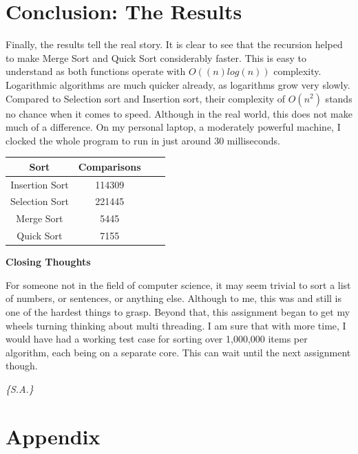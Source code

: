 \documentclass[letterpaper, 10pt]{article}
\begin{document}
\section{Conclusion: The Results}

Finally, the results tell the real story. It is clear to see that the recursion helped to make Merge Sort and Quick Sort considerably faster. This is easy to understand as both functions operate with $O((n)log(n))$ complexity. Logarithmic algorithms are much quicker already, as logarithms grow very slowly.
Compared to Selection sort and Insertion sort, their complexity of $O(n^2)$ stands no chance when it comes to speed. Although in the real world, this does not make much of a difference. On my personal laptop, a moderately powerful machine, I clocked the whole program to run in just around 30 milliseconds.

\begin{center}
{
 \begin{tabular}{||c c c c||} 
 \hline
 Sort & Comparisons \\ [0.5ex] 
 \hline\hline
 Insertion Sort& 114309 \\ 
 \hline
 Selection Sort& 221445 \\
 \hline
 Merge Sort& 5445 \\
 \hline
 Quick Sort& 7155 \\ [1ex] 
 \hline
\end{tabular}
}
\end{center}


\newpage
\textbf{Closing Thoughts}

 For someone not in the field of computer science, it may seem trivial to sort a list of numbers, or sentences, or anything else. Although to me, this was and still is one of the hardest things to grasp. Beyond that, this assignment began to get my wheels turning thinking about multi threading. I am sure that with more time, I would have had a working test case for  sorting over 1,000,000 items per algorithm, each being on a separate core. This can wait until the next assignment though.
 
{\textit{\color{red}\huge{\{S.A.\}}}}
\newpage
\section{Appendix}
\end{document}
